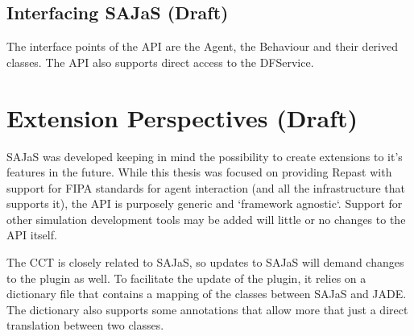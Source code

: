 \subsection{Interfacing SAJaS (Draft)}
\label{sec:arch_interface}
The interface points of the API are the Agent, the Behaviour and their derived classes. The API also supports direct access to the DFService.

\section{Extension Perspectives (Draft)}

SAJaS was developed keeping in mind the possibility to create extensions to it's features in the future. While
this thesis was focused on providing Repast with support for FIPA standards for agent interaction (and all the infrastructure that supports it), the API is purposely generic and `framework agnostic`. Support for other simulation development tools may be added will little or no changes to the API itself.

The CCT is closely related to SAJaS, so updates to SAJaS will demand changes to the plugin as well. To facilitate the update of the plugin, it relies on a dictionary file that contains a mapping of the classes between SAJaS and JADE. The dictionary also supports some annotations that allow more that just a direct translation between two classes.


%
%
%
%
%
